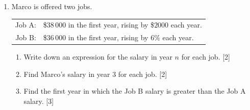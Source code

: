 \documentclass[12pt, twoside]{article}
\begin{document}
\begin{enumerate}[itemsep=0.15cm]
\item[4.] [Maximum mark: 7]

Marco is offered two jobs.

\begin{center}
\begin{tabular}{rl}
Job A: & \$$38\,000$ in the first year, rising by \$$2000$ each year. \\[2pt]
Job B: & \$$36\,000$ in the first year, rising by $6\%$ each year. \\
\end{tabular}
\end{center}

\begin{enumerate}[itemsep=0.1cm]
  \item Write down an expression for the salary in year $n$ for each job.
  \hfill [2]
  \item Find Marco's salary in year $3$ for each job. \hfill [2]
  \item Find the first year in which the Job B salary is greater than the
  Job A salary. \hfill [3]
\end{enumerate}


\end{enumerate}
\end{document}
